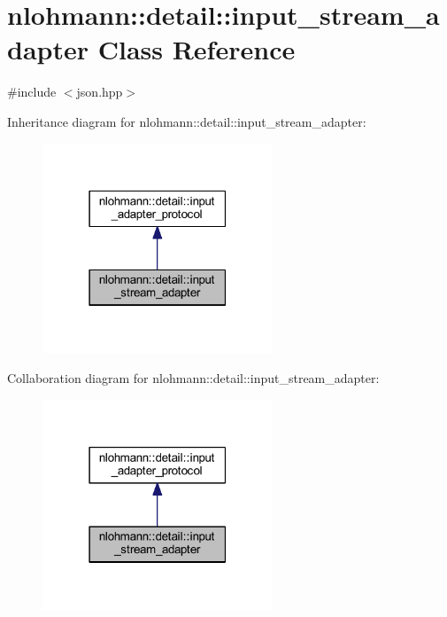 \hypertarget{classnlohmann_1_1detail_1_1input__stream__adapter}{}\section{nlohmann\+::detail\+::input\+\_\+stream\+\_\+adapter Class Reference}
\label{classnlohmann_1_1detail_1_1input__stream__adapter}


{\ttfamily \#include $<$json.\+hpp$>$}



Inheritance diagram for nlohmann\+::detail\+::input\+\_\+stream\+\_\+adapter\+:
\nopagebreak
\begin{figure}[H]
\begin{center}
\leavevmode
\includegraphics[width=195pt]{classnlohmann_1_1detail_1_1input__stream__adapter__inherit__graph}
\end{center}
\end{figure}


Collaboration diagram for nlohmann\+::detail\+::input\+\_\+stream\+\_\+adapter\+:
\nopagebreak
\begin{figure}[H]
\begin{center}
\leavevmode
\includegraphics[width=195pt]{classnlohmann_1_1detail_1_1input__stream__adapter__coll__graph}
\end{center}
\end{figure}
